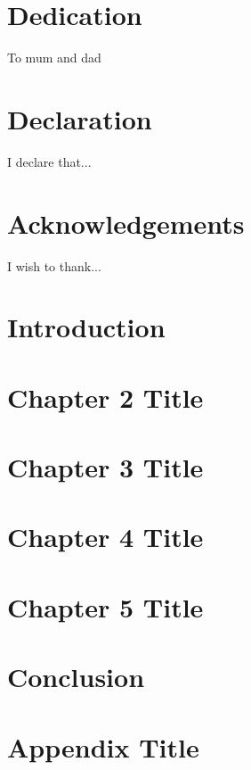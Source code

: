 \documentclass[12pt, twoside]{report}
\begin{document}
    
    
    
    
    \chapter*{Dedication}
    To mum and dad
    
    \chapter*{Declaration}
    I declare that...
    
    \chapter*{Acknowledgements}
    I wish to thank...
    
    \tableofcontents
    \listoffigures
    \listoftables
    
    \chapter{Introduction}
    
    
    \chapter{Chapter 2 Title}
    
    
    \chapter{Chapter 3 Title}
    
    
    \chapter{Chapter 4 Title}
    
    
    \chapter{Chapter 5 Title}
    
    
    \chapter{Conclusion}
    
    
    \appendix
    \chapter{Appendix Title}
    
    
    \printbibliography
\end{document}
